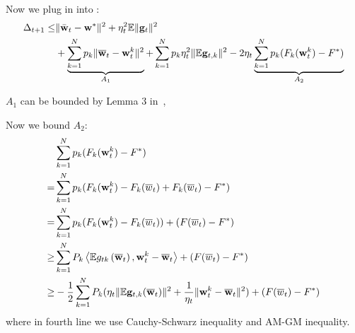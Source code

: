Now we plug in \eq{\ref{eq:exp4}} into \eq{\ref{eq:expand}}:
\begin{align}
	\Delta_{t+1} \leq& \|\bar{{\mathbf{w}}}_{t}-{\mathbf{w}}^{*}\|^{2} + \eta_{t}^{2} \mathbb{E}\| {\mathbf{g}}_{t} \|^{2} \\
	& + \underbrace{\sum_{k=1}^N p_k \|\overline{{\mathbf{w}}}_t - {\mathbf{w}}_t^k\|^2}_{A_1} +  \sum_{k=1}^N p_k \eta_t^2 \|\mathbb{E} {\mathbf{g}}_{t,k}\|^2
  - 2\eta_t\underbrace{\sum_{k=1}^N p_k (F_k({\mathbf{w}}_t^k) - F^*)}_{A_2} \label{eq:main2}
\end{align}

$A_1$ can be bounded by Lemma 3 in~\cite{li2019convergence}, 


Now we bound $A_2$:
\begin{align}
	& \sum_{k=1}^N p_k (F_k({\mathbf{w}}_t^k) - F^*) \\
 = & \sum_{k=1}^N p_k (F_k({\mathbf{w}}_t^k) - F_k(\overline{w}_t) + F_k(\overline{w}_t) - F^*) \\
 = & \sum_{k=1}^N p_k (F_k({\mathbf{w}}_t^k) - F_k(\overline{w}_t) ) + (F(\overline{w}_t) - F^*)\\ 
 \geq & \sum_{k=1}^{N} P_{k}\left<\mathbb{E} g_{t k}\left(\overline{{\mathbf{w}}}_{t}\right), {\mathbf{w}}_{t}^k-\overline{{\mathbf{w}}}_{t}\right> + (F(\overline{w}_t) - F^*)\\
 \geq& -\frac{1}{2} \sum_{k=1}^{N} P_{k} (\eta_t \|\mathbb{E} {\mathbf{g}}_{t,k}(\overline{{\mathbf{w}}}_t) \|^2 + \frac{1}{\eta_t} \|{\mathbf{w}}_t^k - \overline{{\mathbf{w}}}_t\|^2) + (F(\overline{w}_t) - F^*) \label{eq:a24}
\end{align}
where in fourth line we use Cauchy-Schwarz inequality and AM-GM inequality. 


